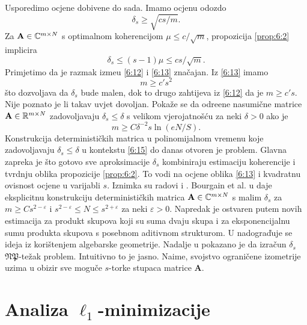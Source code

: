 \documentclass[a4paper,twoside,12pt]{memoir} %
\newcommand{\vect}[1]{\mathbf{#1}}
\renewcommand{\vec}{\vect}
\begin{document}
Usporedimo ocjene dobivene do sada. Imamo ocjenu odozdo
\begin{equation}\label{6:12}
    \delta_s \geq \sqrt{cs/m}. 
\end{equation}
Za $\vec A \in \C^{m \times N}$ s optimalnom koherencijom $\mu \leq c/\sqrt{m}$, propozicija \ref{prop:6:2} implicira
\begin{equation}\label{6:13}
    \delta_s \leq (s-1)\mu \leq cs/\sqrt{m}. 
\end{equation}
Primjetimo da je razmak izme\dj u \eqref{6:12} i \eqref{6:13} zna\v{c}ajan. Iz \eqref{6:13} imamo
\begin{equation}\label{6:14}
    m \geq c' s^2
\end{equation}
\v{s}to dozvoljava da $\delta_s$ bude malen, dok to drugo zahtijeva iz \eqref{6:12} da je $m \geq c's$. Nije poznato je li takav uvjet dovoljan. Poka\v{z}e se da odre\dj ene nasumi\v{c}ne matrice $\vec A \in \R^{m \times N}$ zadovoljavaju $\delta_s \leq \delta$ s velikom vjerojatno\v{s}\'cu za neki $\delta > 0$ ako je
\begin{equation}\label{6:15}
    m \geq C \delta^{-2}s \ln(eN/S).
\end{equation}
Konstrukcija deterministi\v{c}kih matrica u polinomijalnom vremenu koje zadovoljavaju $\delta_s \leq \delta$ u kontekstu \eqref{6:15} do danas otvoren je problem. Glavna zapreka je \v{s}to gotovo sve aproksimacije $\delta_s$ kombiniraju estimaciju koherencije i tvrdnju oblika propozicije \ref{prop:6:2}. To vodi na ocjene oblika \eqref{6:13} i kvadratnu ovisnost ocjene u varijabli $s$. Iznimka su radovi \cite{2010arXiv1008.4535B} i \cite{DBLP:journals/corr/Chen15n}. Bourgain et al. u \cite{2010arXiv1008.4535B} daje eksplicitnu konstrukciju deterministi\v{c}kih matrica $\vec A \in \C^{m \times N}$ s malim $\delta_s$ za $m \geq Cs^{2-\varepsilon}$ i $ s^{2-\varepsilon} \leq N \leq s^{2+\varepsilon}$ za neki $\varepsilon > 0$. Napredak je ostvaren putem novih estimacija za produkt skupova koji su suma dvaju skupa i za eksponencijalnu sumu produkta skupova s posebnom aditivnom strukturom. U \cite{DBLP:journals/corr/Chen15n} nadogra\v{d}uje se ideja iz \cite{2010arXiv1008.4535B} kori\v{s}tenjem algebarske geometrije. Nadalje u \cite{2012arXiv1205.2081T} pokazano je da izra\v{c}un $\delta_s$ $\mathfrak{NP}$-te\v{z}ak problem. Intuitivno to je jasno. Naime, svojstvo ograni\v{c}ene izometrije uzima u obizir sve mogu\v{c}e $s$-torke stupaca matrice $\vec A$.

\newpage
\section[Analiza $\ell_1$-minimizacije][Analiza $\ell_1$-minimizacije]{Analiza $\ell_1$-minimizacije}
\end{document}
